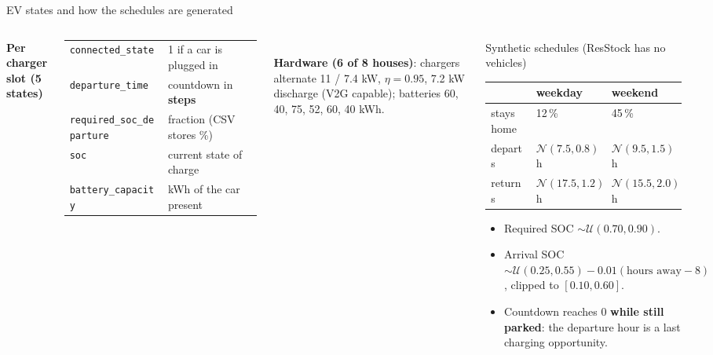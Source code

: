 \documentclass[aspectratio=169,10pt]{beamer}
\begin{document}
\begin{frame}{EV states and how the schedules are generated}
\begin{columns}[T]
\textbf{Per charger slot (5 states)}
\small
\begin{tabular}{@{}ll@{}}
\toprule
\texttt{connected\_state} & 1 if a car is plugged in \\
\texttt{departure\_time} & countdown in \textbf{steps} \\
\texttt{required\_soc\_departure} & fraction (CSV stores \%) \\
\texttt{soc} & current state of charge \\
\texttt{battery\_capacity} & kWh of the car present \\
\bottomrule
\end{tabular}\\[4pt]
\normalsize
\textbf{Hardware (6 of 8 houses)}: chargers alternate 11 / 7.4 kW, $\eta = 0.95$, 7.2 kW discharge (V2G capable); batteries 60, 40, 75, 52, 60, 40 kWh.
\begin{alertblock}{Synthetic schedules (ResStock has no vehicles)}
\small
\begin{tabular}{@{}lll@{}}
\toprule
 & weekday & weekend \\
\midrule
stays home & 12\,\% & 45\,\% \\
departs & $\mathcal N(7.5, 0.8)$ h & $\mathcal N(9.5, 1.5)$ h \\
returns & $\mathcal N(17.5, 1.2)$ h & $\mathcal N(15.5, 2.0)$ h \\
\bottomrule
\end{tabular}
\begin{itemize}
  \item Required SOC $\sim \mathcal U(0.70, 0.90)$.
  \item Arrival SOC $\sim \mathcal U(0.25,0.55) - 0.01(\text{hours away} - 8)$, clipped to $[0.10, 0.60]$.
  \item Countdown reaches 0 \textbf{while still parked}: the departure hour is a last charging opportunity.
\end{itemize}
\end{alertblock}
\end{columns}
\end{frame}
\end{document}
